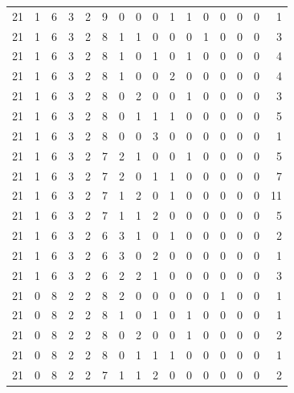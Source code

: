 \begin{appendix}
{\begin{longtable}{lrrrrrrrrrrrrrrr}
    21        & 1  & 6  & 3  & 2  & 9  & 0  & 0  & 0  & 1  & 1  & 0  & 0   & 0   & 0   & 1    \\
    21        & 1  & 6  & 3  & 2  & 8  & 1  & 1  & 0  & 0  & 0  & 1  & 0   & 0   & 0   & 3    \\
    21        & 1  & 6  & 3  & 2  & 8  & 1  & 0  & 1  & 0  & 1  & 0  & 0   & 0   & 0   & 4    \\
    21        & 1  & 6  & 3  & 2  & 8  & 1  & 0  & 0  & 2  & 0  & 0  & 0   & 0   & 0   & 4    \\
    21        & 1  & 6  & 3  & 2  & 8  & 0  & 2  & 0  & 0  & 1  & 0  & 0   & 0   & 0   & 3    \\
    21        & 1  & 6  & 3  & 2  & 8  & 0  & 1  & 1  & 1  & 0  & 0  & 0   & 0   & 0   & 5    \\
    21        & 1  & 6  & 3  & 2  & 8  & 0  & 0  & 3  & 0  & 0  & 0  & 0   & 0   & 0   & 1    \\
    21        & 1  & 6  & 3  & 2  & 7  & 2  & 1  & 0  & 0  & 1  & 0  & 0   & 0   & 0   & 5    \\
    21        & 1  & 6  & 3  & 2  & 7  & 2  & 0  & 1  & 1  & 0  & 0  & 0   & 0   & 0   & 7    \\
    21        & 1  & 6  & 3  & 2  & 7  & 1  & 2  & 0  & 1  & 0  & 0  & 0   & 0   & 0   & 11   \\
    21        & 1  & 6  & 3  & 2  & 7  & 1  & 1  & 2  & 0  & 0  & 0  & 0   & 0   & 0   & 5    \\
    21        & 1  & 6  & 3  & 2  & 6  & 3  & 1  & 0  & 1  & 0  & 0  & 0   & 0   & 0   & 2    \\
    21        & 1  & 6  & 3  & 2  & 6  & 3  & 0  & 2  & 0  & 0  & 0  & 0   & 0   & 0   & 1    \\
    21        & 1  & 6  & 3  & 2  & 6  & 2  & 2  & 1  & 0  & 0  & 0  & 0   & 0   & 0   & 3    \\
    21        & 0  & 8  & 2  & 2  & 8  & 2  & 0  & 0  & 0  & 0  & 0  & 1   & 0   & 0   & 1    \\
    21        & 0  & 8  & 2  & 2  & 8  & 1  & 0  & 1  & 0  & 1  & 0  & 0   & 0   & 0   & 1    \\
    21        & 0  & 8  & 2  & 2  & 8  & 0  & 2  & 0  & 0  & 1  & 0  & 0   & 0   & 0   & 2    \\
    21        & 0  & 8  & 2  & 2  & 8  & 0  & 1  & 1  & 1  & 0  & 0  & 0   & 0   & 0   & 1    \\
    21        & 0  & 8  & 2  & 2  & 7  & 1  & 1  & 2  & 0  & 0  & 0  & 0   & 0   & 0   & 2    \\

\end{longtable}}
\end{appendix}

